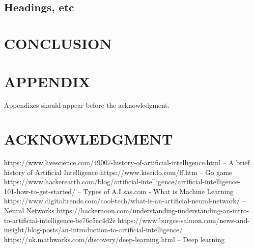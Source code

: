 \documentclass[letterpaper, 10 pt, conference]{ieeeconf}  %
\begin{document}
\subsection{Headings, etc}

 
\section{CONCLUSION}



\addtolength{\textheight}{-12cm}   %

\section*{APPENDIX}

Appendixes should appear before the acknowledgment.

\section*{ACKNOWLEDGMENT}

\begin{thebibliography}{99}

 https://www.livescience.com/49007-history-of-artificial-intelligence.html -- A brief history of Artificial Intelligence
 https://www.kiseido.com/ff.htm -- Go game 
 https://www.hackerearth.com/blog/artificial-intelligence/artificial-intelligence-101-how-to-get-started/ -- Types of A.I
 sas.com - What is Machine Learning
 https://www.digitaltrends.com/cool-tech/what-is-an-artificial-neural-network/ -- Neural Networks
 https://hackernoon.com/understanding-understanding-an-intro-to-artificial-intelligence-be76c5ec4d2e
 https://www.burges-salmon.com/news-and-insight/blog-posts/an-introduction-to-artificial-intelligence/
 https://uk.mathworks.com/discovery/deep-learning.html -- Deep learning




\end{thebibliography}
\end{document}

